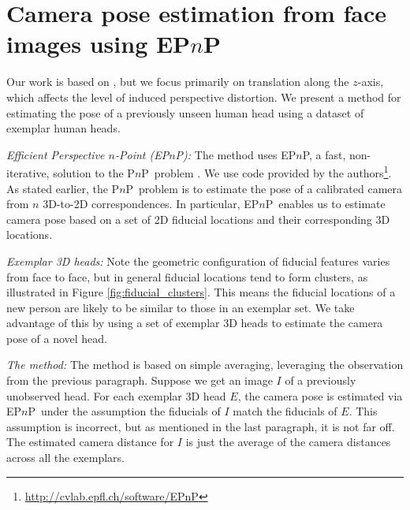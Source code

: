 \documentclass[runningheads]{llncs}
\newcommand {\PnP} {P$n$P}
\newcommand {\EPnP} {EP$n$P}
\begin{document}
\section{Camera pose estimation from face images using \EPnP} \label{sec:method}
Our work is based on \cite{ohayon2006robust}, but we focus primarily on translation along the $z$-axis, which affects the level of induced perspective distortion.  
We present a method for estimating the pose of a previously unseen human head using a dataset of exemplar human heads. 

\textit{Efficient Perspective $n$-Point (\EPnP):} The method uses \EPnP, a fast, non-iterative, solution to the \PnP~problem \cite{lepetit2009epnp}.  
We use code provided by the authors\footnote{\url{http://cvlab.epfl.ch/software/EPnP}}.
As stated earlier, the \PnP~problem is to estimate the pose of a calibrated camera from $n$ 3D-to-2D correspondences.
In particular, \EPnP~enables us to estimate camera pose based on a set of 2D fiducial locations and their corresponding 3D locations.

\textit{Exemplar 3D heads:} Note the geometric configuration of fiducial features varies from face to face, but in general fiducial locations tend to form clusters, as illustrated in Figure \ref{fig:fiducial_clusters}.
This means the fiducial locations of a new person are likely to be similar to those in an exemplar set.
We take advantage of this by using a set of exemplar 3D heads to estimate the camera pose of a novel head.

\textit{The method:} The method is based on simple averaging, leveraging the observation from the previous paragraph.
Suppose we get an image $I$ of a previously unobserved head.
For each exemplar 3D head $E$, the camera pose is estimated via \EPnP~under the assumption the fiducials of $I$ match the fiducials of $E$.
This assumption is incorrect, but as mentioned in the last paragraph, it is not far off.
The estimated camera distance for $I$ is just the average of the camera distances across all the exemplars.
\end{document}
